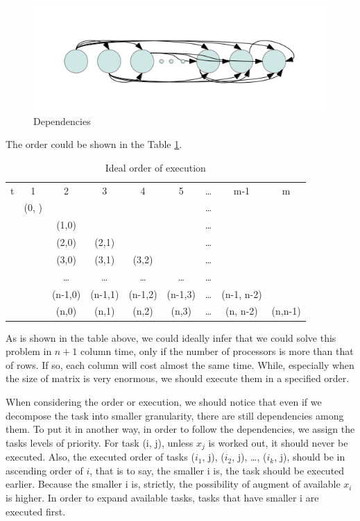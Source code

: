 \documentclass[a4paper]{article}   %
\begin{document}
\begin{CJK}{UTF8}{gbsn}
\begin{spacing}{1.2}
\begin{figure}[htbp]
\centering
\includegraphics[scale=0.5]{dependencies.png} 
\caption{Dependencies}\label{myfig}
\end{figure}

The order could be shown in the Table \ref{tbl:ideal_order}.

\begin{table}[htbp]
\centering
\begin{tabular}{|c|c|c|c|c|c|c|c|c|}
\hline
 t & 1 & 2 & 3 & 4 & 5 & \dots & m-1 & m \\ 
  & (0, ) &  &  &  &  & \dots &  &  \\ 
  &  & (1,0) &  &  &  & \dots &  &  \\ 
  &  & (2,0) &   (2,1) &  &  & \dots & &  \\
  &  & (3,0) &  (3,1) & (3,2) &  &\dots &  &\\
  &  & \dots &  \dots & \dots & \dots & \dots &  &  \\
  &  & (n-1,0) &  (n-1,1) & (n-1,2)& (n-1,3) & \dots &(n-1, n-2) &  \\
  &  & (n,0) &  (n,1)& (n,2) & (n,3) & \dots &(n, n-2) & (n,n-1) \\
\hline 
\end{tabular}
\caption{Ideal order of execution}
\label{tbl:ideal_order}
\end{table} 

As is shown in the table above, we could ideally infer that we could solve this problem in 
 $n+1 $ column time, only if the number of processors is more than that of rows. If so, each column will cost almost the same time. While, especially when the size of matrix is very enormous, we should execute them in a specified order.
 
When considering the order or execution, we should notice that even if we decompose the task into smaller granularity, there are still dependencies among them. To put it in another way, in order to follow the dependencies, we assign the tasks levels of priority. For task (i, j), unless $x_j$ is worked out, it should never be executed. Also, the executed order of tasks ($i_1$, j), ($i_2$, j), \dots, ($i_k$, j), should be in ascending order of $i$, that is to say, the smaller i is, the task should be executed earlier. Because the smaller i is, strictly, the possibility of augment of available $x_i$ is higher. In order to expand available tasks, tasks that have smaller i are executed first. 


\end{spacing}
\end{CJK}
\end{document}
